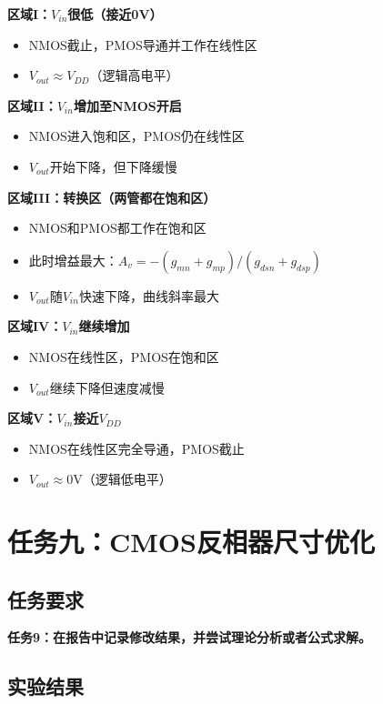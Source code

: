 \documentclass[UTF8,12pt,a4paper]{ctexart}
\begin{document}
\textbf{区域I：$V_{in}$很低（接近0V）}
\begin{itemize}
\item NMOS截止，PMOS导通并工作在线性区
\item $V_{out} \approx V_{DD}$（逻辑高电平）
\end{itemize}

\textbf{区域II：$V_{in}$增加至NMOS开启}
\begin{itemize}
\item NMOS进入饱和区，PMOS仍在线性区
\item $V_{out}$开始下降，但下降缓慢
\end{itemize}

\textbf{区域III：转换区（两管都在饱和区）}
\begin{itemize}
\item NMOS和PMOS都工作在饱和区
\item 此时增益最大：$A_v = -(g_{mn} + g_{mp})/(g_{dsn} + g_{dsp})$
\item $V_{out}$随$V_{in}$快速下降，曲线斜率最大
\end{itemize}

\textbf{区域IV：$V_{in}$继续增加}
\begin{itemize}
\item NMOS在线性区，PMOS在饱和区
\item $V_{out}$继续下降但速度减慢
\end{itemize}

\textbf{区域V：$V_{in}$接近$V_{DD}$}
\begin{itemize}
\item NMOS在线性区完全导通，PMOS截止
\item $V_{out} \approx 0$V（逻辑低电平）
\end{itemize}




\newpage
\section{任务九：CMOS反相器尺寸优化}

\subsection{任务要求}
\textbf{任务9：在报告中记录修改结果，并尝试理论分析或者公式求解。}

\subsection{实验结果}
\end{document}
